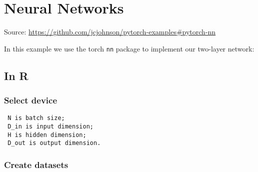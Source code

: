 \documentclass[]{book}
\newenvironment{Shaded}{\begin{snugshade}}{\end{snugshade}}
\newcommand{\CommentTok}[1]{\textcolor[rgb]{0.56,0.35,0.01}{\textit{#1}}}
\newcommand{\KeywordTok}[1]{\textcolor[rgb]{0.13,0.29,0.53}{\textbf{#1}}}
\newcommand{\NormalTok}[1]{#1}
\newcommand{\OperatorTok}[1]{\textcolor[rgb]{0.81,0.36,0.00}{\textbf{#1}}}
\newcommand{\StringTok}[1]{\textcolor[rgb]{0.31,0.60,0.02}{#1}}
\begin{document}
\begin{Shaded}
\end{Shaded}

\hypertarget{neural-networks}{%
\chapter{Neural Networks}\label{neural-networks}}

Source: \url{https://github.com/jcjohnson/pytorch-examples\#pytorch-nn}

In this example we use the torch \texttt{nn} package to implement our two-layer network:

\hypertarget{in-r}{%
\section{In R}\label{in-r}}

\hypertarget{select-device-1}{%
\subsection{Select device}\label{select-device-1}}

\begin{Shaded}
\end{Shaded}

\begin{verbatim}
 N is batch size; 
 D_in is input dimension;
 H is hidden dimension; 
 D_out is output dimension.
\end{verbatim}

\hypertarget{create-datasets}{%
\subsection{Create datasets}\label{create-datasets}}
\end{document}
